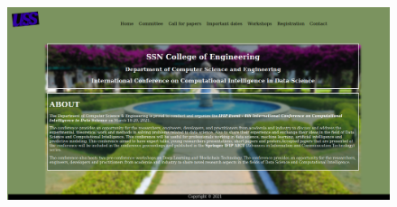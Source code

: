 \documentclass[12pt,letterpaper]{article}
\begin{document}
\subsubsection*{}
\begin{flushleft}

\end{flushleft}

\subsubsection*{}
\begin{flushleft}

\end{flushleft}

\subsubsection*{}
\begin{flushleft}

\end{flushleft}

\subsubsection*{}
\begin{flushleft}

\end{flushleft}

\subsubsection*{{}}
\begin{flushleft}
    
\end{flushleft}

\newpage
\subsection*{}
\subsubsection*{}
\begin{figure}[h]
    \centering
    \includegraphics[width = \textwidth]{Pics/Home.png}
\end{figure}
\end{document}
